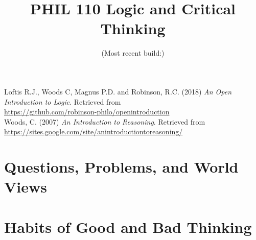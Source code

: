 \documentclass[twoside, openright]{book}
\begin{document}
Loftis R.J., Woods C, Magnus P.D. and Robinson, R.C. (2018) \emph{An Open Introduction to Logic}. Retrieved from \\
\url{https://github.com/robinson-philo/openintroduction} \\

Woods, C. (2007) \emph{An Introduction to Reasoning}. Retrieved from \\
\url{https://sites.google.com/site/anintroductiontoreasoning/} \\

\newpage

\title{\bf PHIL 110 Logic and Critical Thinking}
\author{(Most recent build:)}
\maketitle

\setcounter{tocdepth}{4}
\tableofcontents

\chapter{Questions, Problems, and World Views}


\chapter{Habits of Good and Bad Thinking}
   
%








\end{document}
